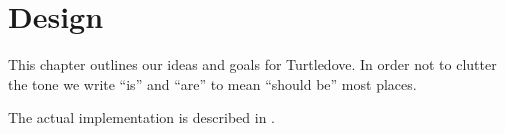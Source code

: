 \chapter{Design} \label{chap:design}
This chapter outlines our ideas and goals for Turtledove. In order not to
clutter the tone we write ``is'' and ``are'' to mean ``should be'' most
places.

The actual implementation is described in .





